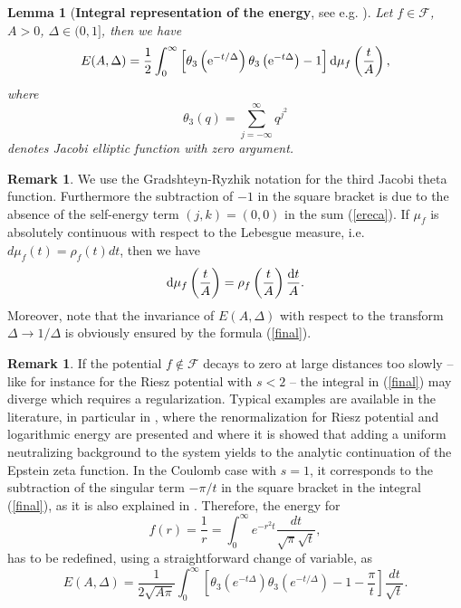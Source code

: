 \documentclass[12pt]{interact}
\newtheorem{lemma}[thm]{Lemma}
\theoremstyle{definition}
\newtheorem{remark}[thm]{Remark}
\begin{document}
\begin{lemma}[\textbf{Integral representation of the energy}, see e.g.
\cite{Bet16,Faulhuber17}]
Let $f\in \mathcal{F}$, $A>0$, $\Delta\in (0,1]$, then we have
\begin{equation} \label{final}
E(A,\Delta) = \frac{1}{2} \int_0^\infty
\left[ \theta_3\left({\rm e}^{-t/\Delta}\right)
\theta_3\left({\rm e}^{-t\Delta}\right) - 1 \right] {\rm d}\mu_f\left(\frac{t}{A} \right) , 
\end{equation}
where
\begin{equation} \label{theta}
\theta_3(q)=\sum_{j=-\infty}^{\infty} q^{j^2}
\end{equation}
denotes Jacobi elliptic function with zero argument.
\end{lemma}
\begin{remark}
We use the Gradshteyn-Ryzhik \cite{Gradshteyn} notation for the third Jacobi theta function. Furthermore the subtraction of $-1$ in the square bracket is due to the absence of
the self-energy term $(j,k)=(0,0)$ in the sum (\ref{ereca}). If $\mu_f$ is absolutely continuous with respect to the Lebesgue measure, i.e. $d\mu_f(t)=\rho_f(t)dt$, then we have
\begin{equation}
{\rm d}\mu_f\left(\frac{t}{A} \right) = \rho_f\left(\frac{t}{A} \right) \frac{{\rm d}t}{A} . 
\end{equation}  
Moreover, note that the invariance of $E(A,\Delta)$ with respect to the transform
$\Delta\to 1/\Delta$ is obviously ensured by the formula (\ref{final}).
\end{remark}


\begin{remark}\label{rmk-renorm}
If the potential $f\not\in \mathcal{F}$ decays to zero at large distances too slowly -- like for instance for the Riesz potential with $s<2$ --
the integral in (\ref{final}) may diverge which requires a regularization. Typical examples are available in the literature, in particular in \cite[Section IV.2]{LewinJelliumReview}, where the renormalization for Riesz potential and logarithmic energy are presented and where it is showed that adding a uniform neutralizing background to the system yields to the analytic continuation of the Epstein zeta function. In the Coulomb case with $s=1$, it corresponds to the subtraction of the singular
term $-\pi/t$ in the square bracket in the integral (\ref{final}),
as it is also explained in \cite{Travenec22}. Therefore, the energy for 
$$
f(r)=\frac{1}{r}=\int_0^\infty e^{-r^2 t} \frac{dt}{\sqrt{\pi}\sqrt{t}},
$$ 
has to be redefined, using a straightforward change of variable, as
$$
E(A,\Delta)=\frac{1}{2\sqrt{A\pi}}\int_0^\infty\left[\theta_3(e^{-t\Delta})\theta_3(e^{-t/\Delta})-1-\frac{\pi}{t} \right]\frac{dt}{\sqrt{t}}.
$$
\end{remark}
\renewcommand{\theequation}{3.\arabic{equation}}
\setcounter{equation}{0}
\end{document}
